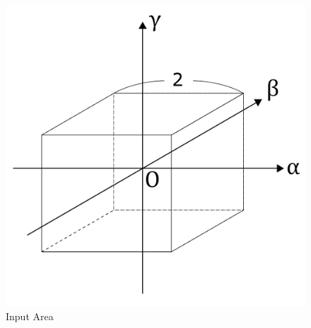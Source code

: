 \begin{figure}[h]
  \centering
  \includegraphics[width=80truemm, clip]{images/input.pdf}
  \caption{Input Area}
  \label{fig:input}
\end{figure}